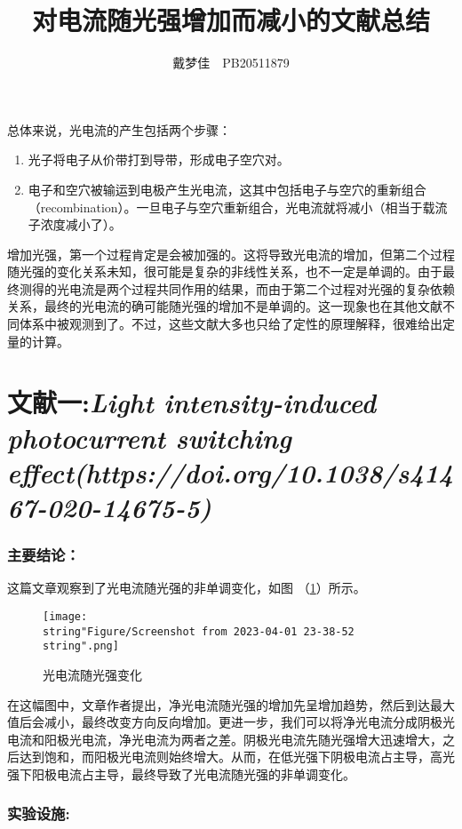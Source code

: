 \documentclass[english]{ctexart}
\begin{document}
\title{对电流随光强增加而减小的文献总结}
\author{戴梦佳\ \ PB20511879}

\maketitle
总体来说，光电流的产生包括两个步骤：
\begin{enumerate}
\item 光子将电子从价带打到导带，形成电子空穴对。
\item 电子和空穴被输运到电极产生光电流，这其中包括电子与空穴的重新组合（recombination）。一旦电子与空穴重新组合，光电流就将减小（相当于载流子浓度减小了）。
\end{enumerate}
增加光强，第一个过程肯定是会被加强的。这将导致光电流的增加，但第二个过程随光强的变化关系未知，很可能是复杂的非线性关系，也不一定是单调的。由于最终测得的光电流是两个过程共同作用的结果，而由于第二个过程对光强的复杂依赖关系，最终的光电流的确可能随光强的增加不是单调的。这一现象也在其他文献不同体系中被观测到了。不过，这些文献大多也只给了定性的原理解释，很难给出定量的计算。

\part{文献一:\emph{Light intensity-induced photocurrent switching effect(https://doi.org/10.1038/s41467-020-14675-5)}}

\section{主要结论：}

这篇文章观察到了光电流随光强的非单调变化，如图 （\ref{fig1}）所示。

\begin{figure}
\texttt{[image: \\string"Figure/Screenshot from 2023-04-01 23-38-52\\string".png]}

\caption{光电流随光强变化}

\label{fig1}
\end{figure}
在这幅图中，文章作者提出，净光电流随光强的增加先呈增加趋势，然后到达最大值后会减小，最终改变方向反向增加。更进一步，我们可以将净光电流分成阴极光电流和阳极光电流，净光电流为两者之差。阴极光电流先随光强增大迅速增大，之后达到饱和，而阳极光电流则始终增大。从而，在低光强下阴极电流占主导，高光强下阳极电流占主导，最终导致了光电流随光强的非单调变化。

\section{实验设施:}
\end{document}
